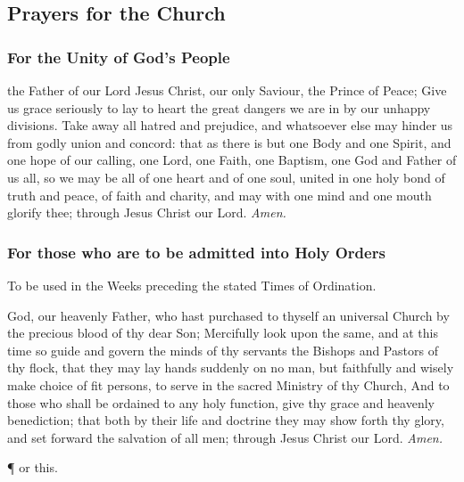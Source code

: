 \subsection{Prayers for the Church}
\subsubsection{For the Unity of God's People}
 the Father of our Lord Jesus Christ, our only Saviour, the Prince of Peace; Give us grace seriously to lay to heart the great dangers we are in by our unhappy divisions. Take away all hatred and prejudice, and whatsoever else may hinder us from godly union and concord: that as there is but one Body and one Spirit, and one hope of our calling, one Lord, one Faith, one Baptism, one God and Father of us all, so we may be all of one heart and of one soul, united in one holy bond of truth and peace, of faith and charity, and may with one mind and one mouth glorify thee; through Jesus Christ our Lord. \textit{Amen.}

\clearpage
\subsubsection{For those who are to be admitted into Holy Orders}

\begin{rubric}
To be used in the Weeks preceding the stated Times of Ordination.
\end{rubric}
 God, our heavenly Father, who hast purchased to thyself an universal Church by the precious blood of thy dear Son; Mercifully look upon the same, and at this time so guide and govern the minds of thy servants the Bishops and Pastors of thy flock, that they may lay hands suddenly on no man, but faithfully and wisely make choice of fit persons, to serve in the sacred Ministry of thy Church, And to those who shall be ordained to any holy function, give thy grace and heavenly benediction; that both by their life and doctrine they may show forth thy glory, and set forward the salvation of all men; through Jesus Christ our Lord. \textit{Amen.}

\vspace{0.25\baselineskip}

\begin{inhead}
	\P{ }or this.
\end{inhead}

\vspace{0.25\baselineskip}

